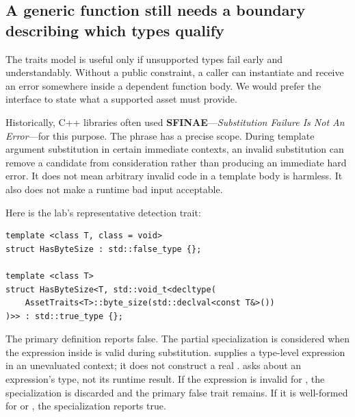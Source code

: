 \subsection{A generic function still needs a boundary describing which types qualify}\label{01-foundations-i-ch005-a-generic-function-still-needs-a-boundary-describing-which-types-qualify}

\hypertarget{01-foundations-i-ch005-a-generic-function-still-needs-a-boundary-describing-which-types-qualify}{}

The traits model is useful only if unsupported types fail early and understandably. Without a public constraint, a caller can instantiate  and receive an error somewhere inside a dependent function body. We would prefer the interface to state what a supported asset must provide.

Historically, C++ libraries often used \textbf{SFINAE}---\emph{Substitution Failure Is Not An Error}---for this purpose. The phrase has a precise scope. During template argument substitution in certain immediate contexts, an invalid substitution can remove a candidate from consideration rather than producing an immediate hard error. It does not mean arbitrary invalid code in a template body is harmless. It also does not make a runtime bad input acceptable.

Here is the lab's representative detection trait:

\begin{verbatim}
template <class T, class = void>
struct HasByteSize : std::false_type {};

template <class T>
struct HasByteSize<T, std::void_t<decltype(
    AssetTraits<T>::byte_size(std::declval<const T&>())
)>> : std::true_type {};
\end{verbatim}

The primary definition reports false. The partial specialization is considered when the expression inside  is valid during substitution.  supplies a type-level expression in an unevaluated context; it does not construct a real .  asks about an expression's type, not its runtime result. If the expression is invalid for , the specialization is discarded and the primary false trait remains. If it is well-formed for  or , the specialization reports true.

